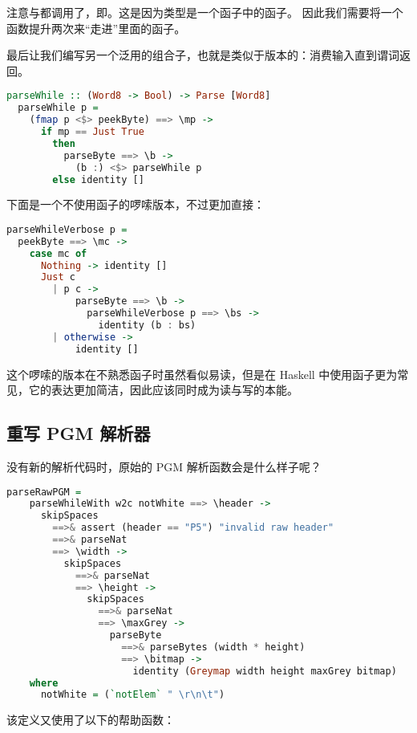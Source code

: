 \documentclass[./main.tex]{subfiles}
\begin{document}
注意与都调用了，即\acode{(<\$>)}。这是因为类型是一个函子中的函子。
因此我们需要将一个函数提升两次来“走进”里面的函子。

最后让我们编写另一个泛用的组合子，也就是类似于版本的：消费输入直到谓词返回。

\begin{lstlisting}[language=Haskell]
  parseWhile :: (Word8 -> Bool) -> Parse [Word8]
  parseWhile p =
    (fmap p <$> peekByte) ==> \mp ->
      if mp == Just True
        then
          parseByte ==> \b ->
            (b :) <$> parseWhile p
        else identity []
\end{lstlisting}

下面是一个不使用函子的啰嗦版本，不过更加直接：

\begin{lstlisting}[language=Haskell]
  parseWhileVerbose p =
  peekByte ==> \mc ->
    case mc of
      Nothing -> identity []
      Just c
        | p c ->
            parseByte ==> \b ->
              parseWhileVerbose p ==> \bs ->
                identity (b : bs)
        | otherwise ->
            identity []
\end{lstlisting}

这个啰嗦的版本在不熟悉函子时虽然看似易读，但是在 Haskell 中使用函子更为常见，它的表达更加简洁，因此应该同时成为读与写的本能。

\subsection*{重写 PGM 解析器}

没有新的解析代码时，原始的 PGM 解析函数会是什么样子呢？

\begin{lstlisting}[language=Haskell]
  parseRawPGM =
    parseWhileWith w2c notWhite ==> \header ->
      skipSpaces
        ==>& assert (header == "P5") "invalid raw header"
        ==>& parseNat
        ==> \width ->
          skipSpaces
            ==>& parseNat
            ==> \height ->
              skipSpaces
                ==>& parseNat
                ==> \maxGrey ->
                  parseByte
                    ==>& parseBytes (width * height)
                    ==> \bitmap ->
                      identity (Greymap width height maxGrey bitmap)
    where
      notWhite = (`notElem` " \r\n\t")
\end{lstlisting}

该定义又使用了以下的帮助函数：
\end{document}
